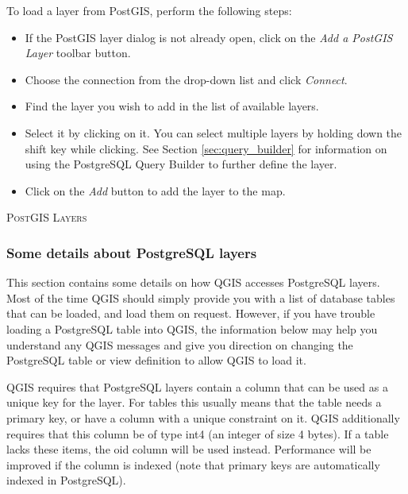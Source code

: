 To load a layer from PostGIS, perform the following steps:

\begin{itemize}
\item If the PostGIS layer dialog is not already open, click on the
\textit{Add a PostGIS Layer} toolbar button.
\item Choose the connection from the drop-down list and click \textsl{Connect}.
\item Find the layer you wish to add in the list of available layers.
\item Select it by clicking on it. You can select multiple layers by holding
down the shift key while clicking. See Section \ref{sec:query_builder} for
information on using the PostgreSQL Query Builder to further define the layer.
\item Click on the \textsl{Add} button to add the layer to the map.
\end{itemize}

\begin{Tip}\caption{\textsc{PostGIS Layers}}
\end{Tip}

\subsubsection{Some details about PostgreSQL
layers}\label{sec:postgis_details}

This section contains some details on how QGIS accesses PostgreSQL
layers. Most of the time QGIS should simply provide you with a list of
database tables that can be loaded, and load them on request. However,
if you have trouble loading a PostgreSQL table into QGIS, the information
below may help you understand any QGIS messages and give you direction on
changing the PostgreSQL table or view definition to allow QGIS to load it.

QGIS requires that PostgreSQL layers contain a column that can be
used as a unique key for the layer. For tables this usually means
that the table needs a primary key, or have a column with a unique
constraint on it. QGIS additionally requires that this column be of
type int4 (an integer of size 4 bytes). If a table lacks these items,
the oid column will be used instead. Performance will be improved if the
column is indexed (note that primary keys are automatically indexed in
PostgreSQL). 

